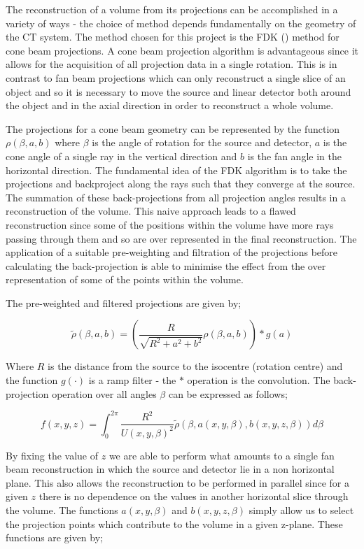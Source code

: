 \documentclass[
  twoside,
  11pt, a4paper,
  footinclude=true,
  headinclude=true,
  cleardoublepage=empty
]{scrbook}
\begin{document}
The reconstruction of a volume from its projections can be accomplished in a variety of ways - the choice of method depends fundamentally on the geometry of the CT system. The method chosen for this project is the FDK (\cite{Feldkamp1984}) method for cone beam projections. A cone beam projection algorithm is advantageous since it allows for the acquisition of all projection data in a single rotation. This is in contrast to fan beam projections which can only reconstruct a single slice of an object and so it is necessary to move the source and linear detector both around the object and in the axial direction in order to reconstruct a whole volume.

The projections for a cone beam geometry can be represented by the function $\rho(\beta,a,b)$ where $\beta$ is the angle of rotation for the source and detector, $a$ is the cone angle of a single ray in the vertical direction and $b$ is the fan angle in the horizontal direction. The fundamental idea of the FDK algorithm is to take the projections and backproject along the rays such that they converge at the source. The summation of these back-projections from all projection angles results in a reconstruction of the volume. This naive approach leads to a flawed reconstruction since some of the positions within the volume have more rays passing through them and so are over represented in the final reconstruction. The application of a suitable pre-weighting and filtration of the projections before calculating the back-projection is able to minimise the effect from the over representation of some of the points within the volume.

The pre-weighted and filtered projections are given by;

\[
\tilde{\rho}(\beta,a,b) = (\frac{R}{\sqrt{R^2+a^2+b^2}}\rho(\beta,a,b))\ast g(a)
\]

Where $R$ is the distance from the source to the isocentre (rotation centre) and the function $g(\cdot)$ is a ramp filter - the $\ast$ operation is the convolution. The back-projection operation over all angles $\beta$ can be expressed as follows;

\[
f(x,y,z) = \int_0^{2\pi} \frac{R^2}{U(x,y,\beta)^2} \tilde{\rho}(\beta,a(x,y,\beta),b(x,y,z,\beta)) d\beta
\]

By fixing the value of $z$ we are able to perform what amounts to a single fan beam reconstruction in which the source and detector lie in a non horizontal plane. This also allows the reconstruction to be performed in parallel since for a given $z$ there is no dependence on the values in another horizontal slice through the volume. The functions $a(x,y,\beta)$ and $b(x,y,z,\beta)$ simply allow us to select the projection points which contribute to the volume in a given z-plane. These functions are given by;
\end{document}
